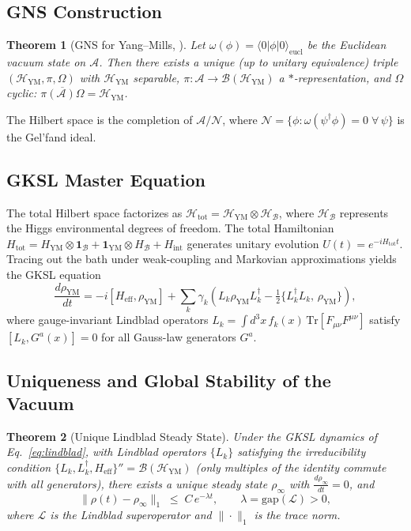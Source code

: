 \documentclass[12pt,a4paper]{article}
\newtheorem{theorem}{Theorem}[section]
\theoremstyle{definition}
\newcommand{\YM}{\mathrm{YM}}
\newcommand{\hilb}{\mathscr{H}}
\newcommand{\Traza}{\mathrm{Tr}}
\newcommand{\Heff}{H_{\mathrm{eff}}}
\newcommand{\bath}{\mathcal{B}}
\begin{document}
\subsection{GNS Construction}

\begin{theorem}[GNS for Yang--Mills, {\cite{Haag}}]
\label{thm:GNS}
Let $\omega(\phi) = \langle 0|\phi|0\rangle_{\mathrm{eucl}}$ be the
Euclidean vacuum state on $\mathcal{A}$. Then there exists a unique
(up to unitary equivalence) triple $(\hilb_{\YM}, \pi, \Omega)$ with
$\hilb_{\YM}$ separable, $\pi: \mathcal{A} \to \mathcal{B}(\hilb_{\YM})$
a $*$-representation, and $\Omega$ cyclic:
$\overline{\pi(\mathcal{A})\Omega} = \hilb_{\YM}$.
\end{theorem}

The Hilbert space is the completion of $\mathcal{A}/\mathcal{N}$, where
$\mathcal{N} = \{\phi : \omega(\psi^{\dagger}\phi) = 0\;\forall\,\psi\}$
is the Gel'fand ideal.

\subsection{GKSL Master Equation}

The total Hilbert space factorizes as
$\hilb_{\mathrm{tot}} = \hilb_{\YM} \otimes \hilb_{\bath}$,
where $\hilb_{\bath}$ represents the Higgs environmental degrees of freedom.
The total Hamiltonian $H_{\mathrm{tot}} = H_{\YM} \otimes \mathbf{1}_{\bath}
+ \mathbf{1}_{\YM} \otimes H_{\bath} + H_{\mathrm{int}}$ generates
unitary evolution $U(t) = e^{-iH_{\mathrm{tot}}t}$. Tracing out the bath
under weak-coupling and Markovian approximations yields the GKSL equation
\begin{equation}
  \frac{d\rho_{\YM}}{dt}
  = -i[\Heff, \rho_{\YM}]
  + \sum_{k} \gamma_{k} \!\left(
    L_{k} \rho_{\YM} L_{k}^{\dagger}
    - \tfrac{1}{2}\{L_{k}^{\dagger} L_{k},\, \rho_{\YM}\}
  \right),
  \label{eq:lindblad}
\end{equation}
where gauge-invariant Lindblad operators
$L_{k} = \int d^{3}x\, f_{k}(x)\, \Traza[F_{\mu\nu}F^{\mu\nu}]$
satisfy $[L_{k}, G^{a}(x)] = 0$ for all Gauss-law generators $G^{a}$.

\subsection{Uniqueness and Global Stability of the Vacuum}
\label{subsec:vacuum_uniqueness}

\begin{theorem}[Unique Lindblad Steady State]
\label{thm:unique_vacuum}
Under the GKSL dynamics of Eq.~\eqref{eq:lindblad}, with Lindblad operators
$\{L_{k}\}$ satisfying the \emph{irreducibility condition}
$\{L_{k}, L_{k}^{\dagger}, \Heff\}'' = \mathcal{B}(\hilb_{\YM})$
(only multiples of the identity commute with all generators), there exists
a \emph{unique} steady state $\rho_{\infty}$ with
$\frac{d\rho_{\infty}}{dt} = 0$, and
\[
  \|\rho(t) - \rho_{\infty}\|_{1}
  \;\leq\; C\, e^{-\lambda t},
  \qquad \lambda = \mathrm{gap}(\mathcal{L}) > 0,
\]
where $\mathcal{L}$ is the Lindblad superoperator and $\|\cdot\|_{1}$
is the trace norm.
\end{theorem}
\end{document}
